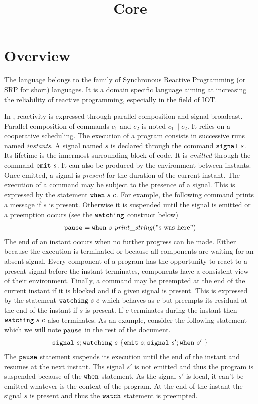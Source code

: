 \documentclass[12pt]{article}
\title{Core \sail}
\def\signal{{\tt{signal}}}
\def\emit{{\tt{emit}}}
\newcommand{\when}[2]{{\tt{when}}~#1~#2}
\newcommand{\watching}[2]{{\tt{watching}}~#1~#2}
\def\sail{{\sc{sail}}}
\begin{document}
\maketitle
\section{Overview}
The \sail{} language belongs to the family of Synchronous Reactive Programming 
(or SRP for short) languages. It is a domain specific language aiming at increasing the
reliability of reactive programming, especially in the field of IOT. 

In \sail{}, reactivity is expressed through parallel composition and signal broadcast. Parallel composition of commands 
$c_1$ and $c_2$ is noted $c_1 \parallel c_2$. It relies on a cooperative scheduling.
The execution of a program consists in successive runs named {\emph{instants}}. 
A signal named $s$ is declared through the command $\signal~s$. Its lifetime is the innermost surrounding block of code.
It is {\emph{emitted}} through the command $\emit~s$. It can also be produced by the environment
between instants. Once emitted, a signal is {\emph{present}} for the duration of the current instant. 
The execution of a command may be subject to the presence of a signal.
This is expressed by the statement $\when{s}{c}$. 
For example, the following command prints a message if $s$ is present. Otherwise it is suspended
until the signal is emitted or a preemption occurs (see the ${\tt{watching}}$ construct below)
$$
\begin{array}{l}
  {\tt{pause}} = \when{s}{{\mathit{print\_string}}("{\text{s was here}}")}
\end{array}
$$
The end of an instant occurs when  no further progress can be made. Either because the execution 
is terminated or because all components are waiting for an absent signal.
Every component of a program has the opportunity to react to a present signal before the instant
terminates, components have a consistent view of their environment. 
Finally, a command may be preempted at the end of the current instant if it is blocked and if a given signal is present. 
This is expressed by the statement $\watching{s}{c}$ which behaves as $c$ but preempts its residual at the end 
of the instant if $s$ is present. If $c$ terminates during the instant then $\watching{s}{c}$ also terminates.
As an example, consider the following statement which we will note ${\tt{pause}}$ in the rest of the document.
$$
\begin{array}{c}
  \signal~s; \watching{s}{\{\emit~s;\signal~s';\when{s'}{}\}}
\end{array}
$$
The ${\tt{pause}}$ statement suspends its execution until the end of the instant and resumes at the next instant.
Ths signal $s'$ is not emitted and thus the program is suspended because of the ${\tt{when}}$ statement. As the signal $s'$ is 
local, it can't be emitted whatever is the context of the program. At the end of 
the instant the signal $s$ is present and thus the ${\tt{watch}}$ statement is preempted.
\end{document}
